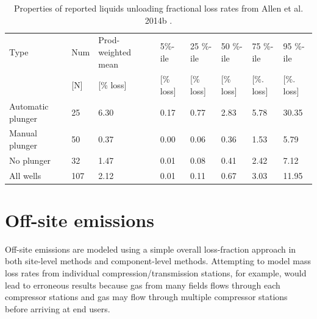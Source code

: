 \documentclass[11pt]{report}
\begin{document}
\begin{table}
\begin{scriptsize}
\caption{Properties of reported liquids unloading fractional loss rates from Allen et al. 2014b \cite{Allen2014b}.}
\label{tab:LU_emissions_table}
\begin{tabular*}{1\columnwidth}{p{}p{}p{}p{}p{}p{}p{}p{}}
\toprule
Type                                           & Num 		& Prod-weighted mean 	& 5\%-ile 			& 25 \%-ile 		& 50 \%-ile 		& 75 \%-ile		& 95 \%-ile	 \\
                                                  & {[}N{]}       	& {[}\% loss{]}           		& {[}\% loss{]}   		&{[}\% loss{]}   		& {[}\% loss{]}   		& {[}\%. loss{]}		& {[}\%. loss{]}\\
\midrule
Automatic plunger                    	& 25                 & 6.30               			& 0.17            	& 0.77                 	& 2.83               	& 5.78               	& 30.35   \\
Manual plunger            		& 50                 & 0.37                      		& 0.00             	& 0.06                  	& 0.36               	& 1.53                	&  5.79 \\
No plunger       				& 32                 & 1.47                     		& 0.01           	& 0.08                  	& 0.41               	& 2.42                	&  7.12 \\
All wells 					& 107               & 2.12                       		& 0.01              	& 0.11                   	& 0.67                	& 3.03              		&  11.95  \\
\bottomrule
\end{tabular*}
\end{scriptsize}
\end{table}






\section{Off-site emissions}

Off-site emissions are modeled using a simple overall loss-fraction approach in both site-level methods and component-level methods. Attempting to model mass loss rates from individual compression/transmission stations, for example, would lead to erroneous results because gas from many fields flows through each compressor stations and gas may flow through multiple compressor stations before arriving at end users.
\end{document}
